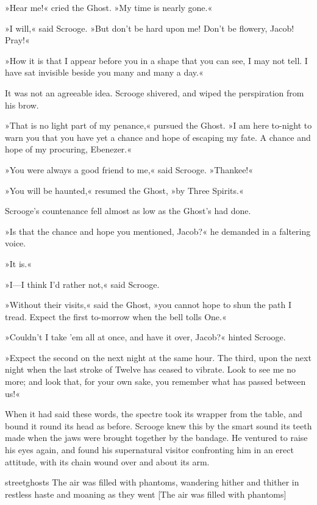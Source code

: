 »Hear me!« cried the Ghost. »My time is nearly gone.«

»I will,« said Scrooge. »But don't be hard upon me! Don't be flowery, Jacob! Pray!«

»How it is that I appear before you in a shape that you can see, I may not tell. I have sat invisible beside you many and many a day.«

It was not an agreeable idea. Scrooge shivered, and wiped the perspiration from his brow.

»That is no light part of my penance,« pursued the Ghost. »I am here to-night to warn you that you have yet a chance and hope of escaping my fate. A chance and hope of my procuring, Ebenezer.«

»You were always a good friend to me,« said Scrooge. »Thankee!«

»You will be haunted,« resumed the Ghost, »by Three Spirits.«

Scrooge's countenance fell almost as low as the Ghost's had done.

»Is that the chance and hope you mentioned, Jacob?« he demanded in a faltering voice.

»It is.«

»I---I think I'd rather not,« said Scrooge.

»Without their visits,« said the Ghost, »you cannot hope to shun the path I tread. Expect the first to-morrow when the bell tolls One.«

»Couldn't I take 'em all at once, and have it over, Jacob?« hinted Scrooge.

»Expect the second on the next night at the same hour. The third, upon the next night when the last stroke of Twelve has ceased to vibrate. Look to see me no more; and look that, for your own sake, you remember what has passed between us!«

When it had said these words, the spectre took its wrapper from the table, and bound it round its head as before. Scrooge knew this by the smart sound its teeth made when the jaws were brought together by the bandage. He ventured to raise his eyes again, and found his supernatural visitor confronting him in an erect attitude, with its chain wound over and about its arm.

\begin{colorbigpic}
	[\bigpicsize]
	{streetghosts}
	{The air was filled with phantoms, wandering hither and thither in restless haste and moaning as they went}
	[The air was filled with phantoms]
\end{colorbigpic}


